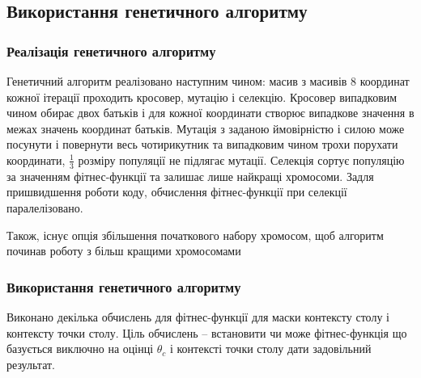 \documentclass[a4paper,14pt]{report}
\begin{document}
\subsection{Використання генетичного алгоритму}
\subsubsection{Реалізація генетичного алгоритму}
Генетичний алгоритм реалізовано наступним чином: масив з масивів 8 координат кожної ітерації проходить кросовер, мутацію і селекцію. Кросовер випадковим чином обирає двох батьків і для кожної координати створює випадкове значення в межах значень координат батьків. 
Мутація з заданою ймовірністю і силою може посунути і повернути весь чотирикутник та випадковим чином трохи порухати координати, $\frac{1}{3}$ розміру популяції не підлягає мутації. Селекція сортує популяцію за значенням фітнес-функції та залишає лише найкращі хромосоми. 
Задля пришвидшення роботи коду, обчислення фітнес-функції при селекції паралелізовано.

Також, існує опція збільшення початкового набору хромосом, щоб алгоритм починав роботу з більш кращими хромосомами

\subsubsection{Використання генетичного алгоритму}
Виконано декілька обчислень для фітнес-функції для маски контексту столу і контексту точки столу. Ціль обчислень -- встановити чи може фітнес-функція що базується виключно на оцінці $\theta_c$ і контексті точки столу дати задовільний результат.
\end{document}
